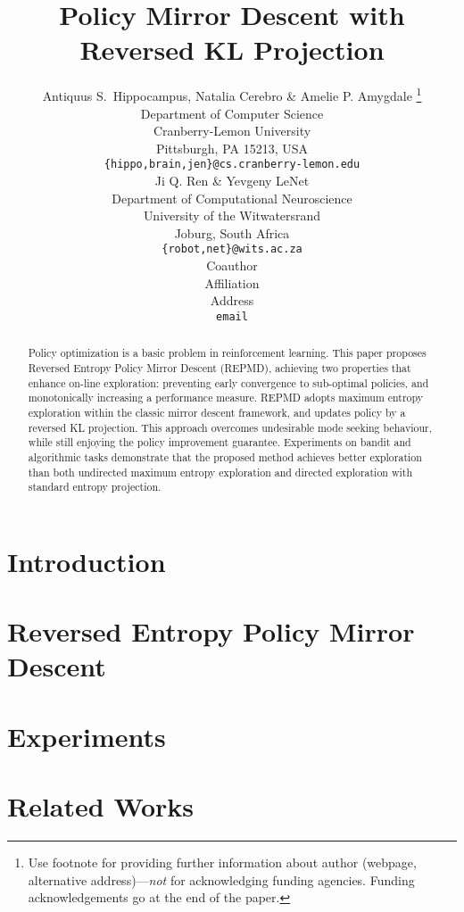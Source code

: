 \documentclass{article} %
\title{Policy Mirror Descent with Reversed KL Projection}
\author{Antiquus S.~Hippocampus, Natalia Cerebro \& Amelie P. Amygdale \thanks{ Use footnote for providing further information
about author (webpage, alternative address)---\emph{not} for acknowledging
funding agencies.  Funding acknowledgements go at the end of the paper.} \\
Department of Computer Science\\
Cranberry-Lemon University\\
Pittsburgh, PA 15213, USA \\
\texttt{\{hippo,brain,jen\}@cs.cranberry-lemon.edu} \\
\And
Ji Q. Ren \& Yevgeny LeNet \\
Department of Computational Neuroscience \\
University of the Witwatersrand \\
Joburg, South Africa \\
\texttt{\{robot,net\}@wits.ac.za} \\
\AND
Coauthor \\
Affiliation \\
Address \\
\texttt{email}
}
\begin{document}
\maketitle

\begin{abstract}
Policy optimization is a basic problem in reinforcement learning. This paper proposes Reversed Entropy Policy Mirror Descent (REPMD), achieving two properties that enhance on-line exploration: preventing early convergence to  sub-optimal policies, and monotonically increasing a performance measure. REPMD adopts maximum entropy exploration within the classic mirror descent framework, and updates policy by a reversed KL projection. This approach overcomes undesirable mode seeking behaviour, while still enjoying the policy improvement guarantee. Experiments on bandit and algorithmic tasks demonstrate that the proposed method achieves better exploration than both undirected maximum entropy exploration and directed exploration with standard entropy projection.
\end{abstract}

\section{Introduction}
\label{sec:intro}


%

\section{Reversed Entropy Policy Mirror Descent}
\label{sec:reversed_emtropy_policy_mirror_descent}


\section{Experiments}
\label{sec:experiments}


\section{Related Works}
\label{sec:related_work}







\newpage
\appendix 

\end{document}
